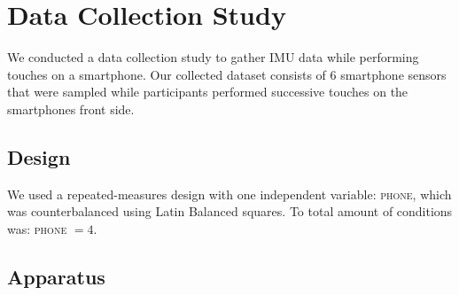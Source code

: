 \section{Data Collection Study}
We conducted a data collection study to gather IMU data while performing touches on a smartphone.
Our collected dataset consists of 6 smartphone sensors that were sampled while participants performed successive touches on the smartphones front side. 
\subsection{Design}
We used a repeated-measures design with one independent variable: \textsc{phone}, which was counterbalanced using Latin Balanced squares. To total amount of conditions was: \textsc{phone} $ = 4$.
\subsection{Apparatus}

